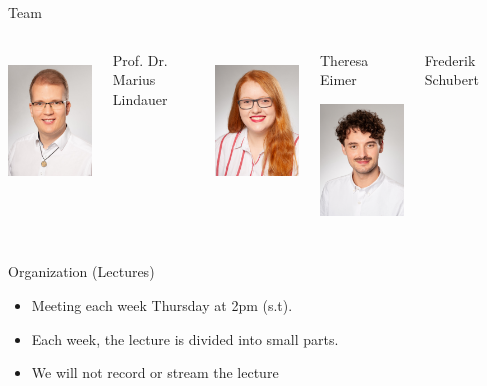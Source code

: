 \documentclass[aspectratio=169]{../latex_main/tntbeamer}  %
\begin{document}
\begin{frame}[c]{Team}
	
	\begin{columns}[T]
		
		\centering
		\includegraphics[height=10em]{images/lindauer}
		
		Prof. Dr.\\ Marius Lindauer
		
		\centering
		\includegraphics[height=10em]{images/eimer}
		
		Theresa Eimer\\
		
		\centering
		\includegraphics[height=10em]{images/schubert}
		
		Frederik Schubert \\
		
		
	\end{columns}
	
	
\end{frame}
\begin{frame}[c]{Organization (Lectures)}
	
	\begin{itemize}
		\item Meeting each week Thursday at 2pm (s.t).
		\pause
		\item Each week, the lecture is divided into small parts.
		\pause
		\item We will not record or stream the lecture
	\end{itemize}
	
\end{frame}
\end{document}
